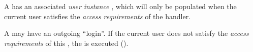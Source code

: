 A  has an associated \textit{user instance} , which will only be populated when the current user satisfies the \textit{access requirements} of the handler.

A  may have an outgoing   ``login''. If the current user does not satisfy the \textit{access requirements} of this , the  is executed ().

